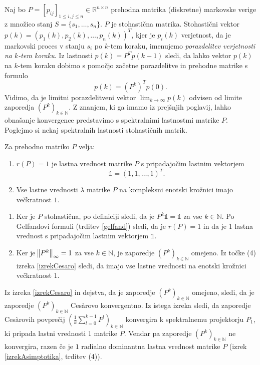 \documentclass[mat1]{fmfdelo}
\newcommand{\R}{\mathbb R}
\newcommand{\N}{\mathbb N}
\begin{document}
Naj bo $P = [p_{ij}]_{1 \leq i,j \leq n} \in \R^{n \times n}$ prehodna matrika (diskretne) markovske verige z množico stanj $S = \{s_1, \ldots, s_n\}$. $P$ je stohastična matrika. Stohastični vektor $p(k) = \left(p_1(k), p_2(k), \ldots, p_n(k)\right)^T$, kjer je $p_i(k)$ verjetnost, da je markovski proces v stanju $s_i$ po $k$-tem koraku, imenujemo \emph{porazdelitev verjetnosti na $k$-tem koraku}. Iz lastnosti $p(k) = P^T p(k-1)$ sledi, da lahko vektor $p(k)$ na $k$-tem koraku dobimo s pomočjo začetne porazdelitve in prehodne matrike s formulo
\begin{equation}\label{eqKtiKorakMarkov}
    p(k) = (P^k)^T p(0).
\end{equation}
Vidimo, da je limitni porazdelitveni vektor $\lim_{k\rightarrow\infty} p(k)$ odvisen od limite zaporedja $(P^k)_{k\in\N}$. Z znanjem, ki ga imamo iz prejšnjih poglavij, lahko obnašanje konvergence predstavimo s spektralnimi lastnostmi matrike $P$. Poglejmo si nekaj spektralnih lastnosti stohastičnih matrik.
\begin{trditev}
    Za prehodno matriko $P$ velja:
    \begin{enumerate}
        \item $r(P) = 1$ je lastna vrednost matrike $P$ s pripadajočim lastnim vektorjem
        \begin{equation*}
            \mathds{1} = (1, 1, \ldots, 1)^T.
        \end{equation*}
        \item Vse lastne vrednosti $\lambda$ matrike $P$ na kompleksni enotski krožnici imajo večkratnost $1$.
    \end{enumerate}
\end{trditev}
\begin{dokaz}
    \leavevmode
    \begin{enumerate}
        \item Ker je $P$ stohastična, po definiciji sledi, da je $P^k \mathds{1} = \mathds{1}$ za vse $k \in \N$. Po Gelfandovi formuli (trditev \ref{gelfand}) sledi, da je $r(P) = 1$ in da je $1$ lastna vrednost s pripadajočim lastnim vektorjem $\mathds{1}$.
        \item Ker je $\norm{P^k}_\infty = 1$ za vse $k \in \N$, je zaporedje $(P^k)_{k\in\N}$ omejeno. Iz točke (4) izreka \ref{izrekCesaro} sledi, da imajo vse lastne vrednosti na enotski krožnici večkratnost $1$.
    \end{enumerate}
\end{dokaz}
Iz izreka \ref{izrekCesaro} in dejstva, da je zaporedje $(P^k)_{k\in\N}$ omejeno, sledi, da je zaporedje $(P^k)_{k\in\N}$ Ces\`arovo konvergentno. Iz istega izreka sledi, da zaporedje Ces\`arovih povprečij $\left(\frac{1}{k} \sum_{l=0}^{k-1} P^l\right)_{k\in\N}$ konvergira k spektralnemu projektorju $P_1$, ki pripada lastni vrednosti $1$ matrike $P$. Vendar pa zaporedje $(P^k)_{k\in\N}$ ne konvergira, razen če je $1$ radialno dominantna lastna vrednost matrike $P$ (izrek \ref{izrekAsimptotika}, trditev (4)).
\end{document}
